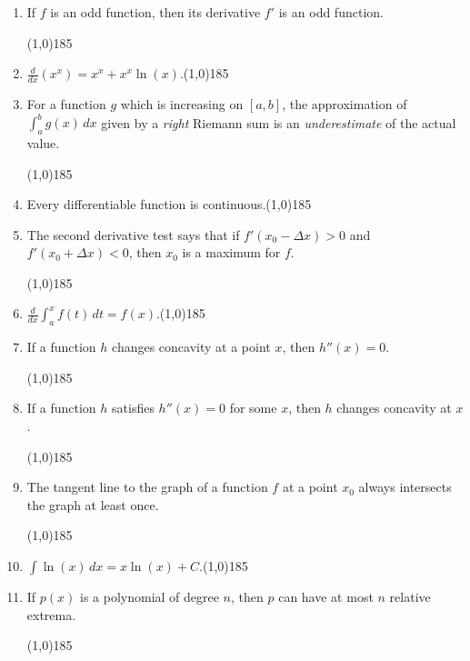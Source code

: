 \documentclass[12 pt]{article}
\newenvironment{tfenum}{
	\begin{enumerate}[label={(\alph*)}]
		\setlength{\itemsep}{6pt}
		\setlength{\parskip}{10pt}
		\setlength{\parsep}{0pt}}
	{\end{enumerate}}
\newcommand{\ti}[1]{\textit{#1}}
\begin{document}
\begin{enumerate}[resume, leftmargin=-0.25in, rightmargin=-0.25in]
\begin{tfenum}
	\item If $f$ is an odd function, then its derivative $f'$ is an odd function.	\begin{flushright}\line(1,0){185}\end{flushright}
	\item $\frac{d}{dx}\left(x^x\right)=x^x+x^x\ln(x)$.\hfill\line(1,0){185}
	\item For a function $g$ which is increasing on $[a,b]$, the approximation of $\int_a^b g(x)\,dx$ given by a \ti{right} Riemann sum is an \ti{underestimate} of the actual value.\vspace{-3mm} \begin{flushright}\line(1,0){185}\end{flushright}
	\item Every differentiable function is continuous.\hfill\line(1,0){185}
	\item The second derivative test says that if $f'(x_0-\Delta x)>0$ and $f'(x_0+\Delta x)<0$, then $x_0$ is a maximum for $f$.\vspace{-6mm} \begin{flushright}\line(1,0){185}\end{flushright}
	\item $\frac{d}{dx}\int_a^x f(t)\,dt=f(x)$.\hfill\line(1,0){185}
	\item If a function $h$ changes concavity at a point $x$, then $h''(x)=0$.\vspace{-3mm} \begin{flushright}\line(1,0){185}\end{flushright}
	\item If a function $h$ satisfies $h''(x)=0$ for some $x$, then $h$ changes concavity at $x$.\vspace{-3mm} \begin{flushright}\line(1,0){185}\end{flushright}
	\item The tangent line to the graph of a function $f$ at a point $x_0$ always intersects the graph at least once.\vspace{-6mm}
	\begin{flushright}\line(1,0){185}\end{flushright}
	\item $\int \ln(x)\,dx=x\ln(x) + C$.\hfill\line(1,0){185}
	\item If $p(x)$ is a polynomial of degree $n$, then $p$ can have at most $n$ relative extrema.\vspace{-3mm}	\begin{flushright}\line(1,0){185}\end{flushright}

\end{tfenum}
\end{enumerate}
\end{document}
